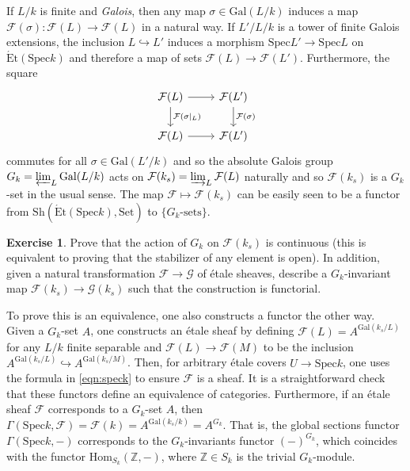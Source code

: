 \documentclass{article}
\newcommand{\Hom}{\mathrm{Hom}}
\newcommand{\Spec}{\mathrm{Spec}}
\newcommand{\Gal}{\mathrm{Gal}}
\newcommand{\Set}{\mathrm{Set}}
\newcommand{\Et}{\acute{\mathrm{E}}\mathrm{t}}
\newcommand{\Sh}{\mathrm{Sh}}
\newcommand{\ZZ}{\mathbb{Z}}
\theoremstyle{plain}
\theoremstyle{definition}
\newtheorem*{exercise}{Exercise}
\begin{document}
    If $L/k$ is finite and \textit{Galois}, then any map $\sigma\in\Gal(L/k)$ induces a map $\mathcal{F}(\sigma):\mathcal{F}(L)\to\mathcal{F}(L)$ in a natural way. If $L'/L/k$ is a tower of finite Galois extensions, the inclusion $L\hookrightarrow L'$ induces a morphism $\Spec L'\to\Spec L$ on $\Et(\Spec k)$ and therefore a map of sets $\mathcal{F}(L)\to\mathcal{F}(L')$. Furthermore, the square 
    \[
        \begin{tikzcd}
            \mathcal{F}(L) \arrow[r,""] \arrow[d,"\mathcal{F}(\sigma|_L)"] & \mathcal{F}(L') \arrow[d,"\mathcal{F}(\sigma)"] \\
            \mathcal{F}(L) \arrow[r,""] & \mathcal{F}(L')
        \end{tikzcd}
    \]
    commutes for all $\sigma\in\Gal(L'/k)$ and so the absolute Galois group $G_k=\varprojlim_{L}\Gal(L/k)$ acts on $\mathcal{F}(k_s)=\varinjlim_{L}\mathcal{F}(L)$ naturally and so $\mathcal{F}(k_s)$ is a $G_k$-set in the usual sense. The map $\mathcal{F}\mapsto\mathcal{F}(k_s)$ can be easily seen to be a functor from $\Sh(\Et(\Spec k),\Set)$ to $\{G_k\text{-sets}\}$.
    \begin{exercise}
        Prove that the action of $G_k$ on $\mathcal{F}(k_s)$ is continuous (this is equivalent to proving that the stabilizer of any element is open). In addition, given a natural transformation $\mathcal{F}\to\mathcal{G}$ of \'{e}tale sheaves, describe a $G_k$-invariant map $\mathcal{F}(k_s)\to\mathcal{G}(k_s)$ such that the construction is functorial.
    \end{exercise}

    To prove this is an equivalence, one also constructs a functor the other way. Given a $G_k$-set $A$, one constructs an \'{e}tale sheaf by defining $\mathcal{F}(L)=A^{\Gal(k_s/L)}$ for any $L/k$ finite separable and $\mathcal{F}(L)\to\mathcal{F}(M)$ to be the inclusion $A^{\Gal(k_s/L)}\hookrightarrow A^{\Gal(k_s/M)}$. Then, for arbitrary \'{e}tale covers $U\to\Spec k$, one uses the formula in \eqref{eqn:speck} to ensure $\mathcal{F}$ is a sheaf. It is a straightforward check that these functors define an equivalence of categories. Furthermore, if an \'{e}tale sheaf $\mathcal{F}$ corresponds to a $G_k$-set $A$, then $\Gamma(\Spec k,\mathcal{F})=\mathcal{F}(k)=A^{\Gal(k_s/k)}=A^{G_k}$. That is, the global sections functor $\Gamma(\Spec k,-)$ corresponds to the $G_k$-invariants functor $(-)^{G_k}$, which coincides with the functor $\Hom_{S_k}(\ZZ,-)$, where $\ZZ\in S_k$ is the trivial $G_k$-module.
    
\end{document}
